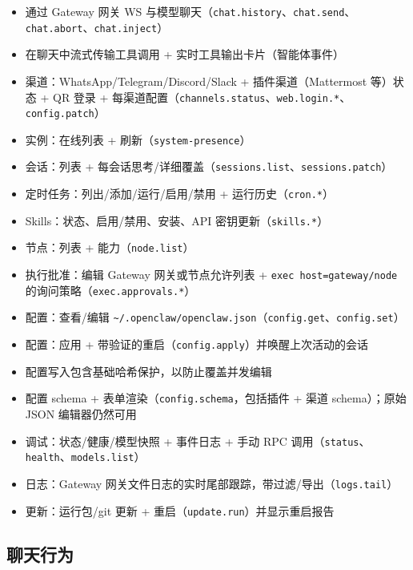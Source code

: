 \begin{itemize}
  \item 通过 Gateway 网关 WS 与模型聊天（\texttt{chat.history}、\texttt{chat.send}、\texttt{chat.abort}、\texttt{chat.inject}）
  \item 在聊天中流式传输工具调用 + 实时工具输出卡片（智能体事件）
  \item 渠道：WhatsApp/Telegram/Discord/Slack + 插件渠道（Mattermost 等）状态 + QR 登录 + 每渠道配置（\texttt{channels.status}、\texttt{web.login.*}、\texttt{config.patch}）
  \item 实例：在线列表 + 刷新（\texttt{system-presence}）
  \item 会话：列表 + 每会话思考/详细覆盖（\texttt{sessions.list}、\texttt{sessions.patch}）
  \item 定时任务：列出/添加/运行/启用/禁用 + 运行历史（\texttt{cron.*}）
  \item Skills：状态、启用/禁用、安装、API 密钥更新（\texttt{skills.*}）
  \item 节点：列表 + 能力（\texttt{node.list}）
  \item 执行批准：编辑 Gateway 网关或节点允许列表 + \texttt{exec host=gateway/node} 的询问策略（\texttt{exec.approvals.*}）
  \item 配置：查看/编辑 \texttt{\textasciitilde{}/.openclaw/openclaw.json}（\texttt{config.get}、\texttt{config.set}）
  \item 配置：应用 + 带验证的重启（\texttt{config.apply}）并唤醒上次活动的会话
  \item 配置写入包含基础哈希保护，以防止覆盖并发编辑
  \item 配置 schema + 表单渲染（\texttt{config.schema}，包括插件 + 渠道 schema）；原始 JSON 编辑器仍然可用
  \item 调试：状态/健康/模型快照 + 事件日志 + 手动 RPC 调用（\texttt{status}、\texttt{health}、\texttt{models.list}）
  \item 日志：Gateway 网关文件日志的实时尾部跟踪，带过滤/导出（\texttt{logs.tail}）
  \item 更新：运行包/git 更新 + 重启（\texttt{update.run}）并显示重启报告
\end{itemize}


\subsection{聊天行为}


